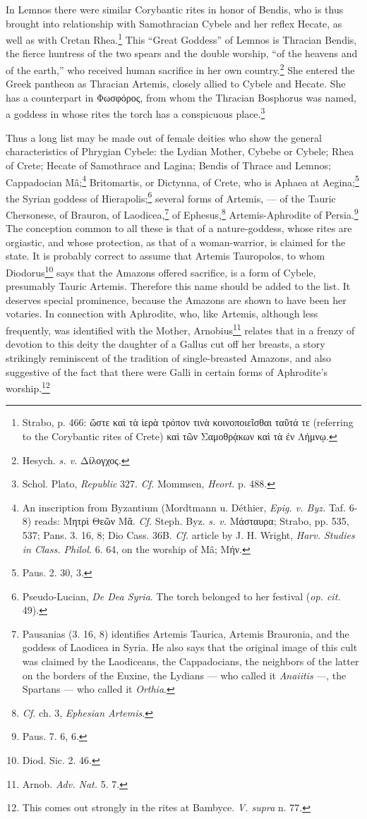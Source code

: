 \documentclass[a4paper, 12pt, oneside]{article}
\begin{document}
In Lemnos there were similar Corybantic rites in honor of Bendis, who is thus brought into relationship with Samothracian Cybele and her reflex Hecate, as well as with Cretan Rhea.\footnote{Strabo, p. 466: ὥστε καὶ τὰ ἱερὰ τρόπον τινὰ κοινοποιεῖσθαι ταῦτά τε (referring to the Corybantic rites of Crete) καὶ τῶν Σαμοθρᾴκων καὶ τὰ ἐν Λήμνῳ.} This ``Great Goddess'' of Lemnos is Thracian Bendis, the fierce huntress of the two spears and the double worship, ``of the heavens and of the earth,'' who received human sacrifice in her own country.\footnote{Hesych. \emph{s. v.} Δίλογχος.} She entered the Greek pantheon as Thracian Artemis, closely allied to Cybele and Hecate. She has a counterpart in Φωσφόρος, from whom the Thracian Bosphorus was named, a goddess in whose rites the torch has a conspicuous place.\footnote{Schol. Plato, \emph{Republic} 327. \emph{Cf.} Mommsen, \emph{Heort.} p. 488.}

Thus a long list may be made out of female deities who show the general characteristics of Phrygian Cybele: the Lydian Mother, Cybebe or Cybele; Rhea of Crete; Hecate of Samothrace and Lagina; Bendis of Thrace and Lemnos; Cappadocian Mâ;\footnote{An inscription from Byzantium (Mordtmann u. Déthier, \emph{Epig. v. Byz.} Taf. 6-8) reads: Μητρὶ Θεῶν Μᾶ. \emph{Cf.} Steph. Byz. \emph{s. v.} Μάσταυρα; Strabo, pp. 535, 537; Pans. 3. 16, 8; Dio Cass. 36B. \emph{Cf.} article by J. H. Wright, \emph{Harv. Studies in Class. Philol.} 6. 64, on the worship of Mâ; Μήν.} Britomartis, or Dictynna, of Crete, who is Aphaea at Aegina;\footnote{Paus. 2. 30, 3.} the Syrian goddess of Hierapolis;\footnote{Pseudo-Lucian, \emph{De Dea Syria}. The torch belonged to her festival (\emph{op. cit.} 49).} several forms of Artemis, --- of the Tauric Chersonese, of Brauron, of Laodicea,\footnote{Pausanias (3. 16, 8) identifies Artemis Taurica, Artemis Brauronia, and the goddess of Laodicea in Syria. He also says that the original image of this cult was claimed by the Laodiceans, the Cappadocians, the neighbors of the latter on the borders of the Euxine, the Lydians --- who called it \emph{Anaiitis} ---, the Spartans --- who called it \emph{Orthia}.} of Ephesus,\footnote{\emph{Cf.} ch. 3, \emph{Ephesian Artemis}.} Artemis-Aphrodite of Persia.\footnote{Paus. 7. 6, 6.} The conception common to all these is that of a nature-goddess, whose rites are orgiastic, and whose protection, as that of a woman-warrior, is claimed for the state. It is probably correct to assume that Artemis Tauropolos, to whom Diodorus\footnote{Diod. Sic. 2. 46.} says that the Amazons offered sacrifice, is a form of Cybele, presumably Tauric Artemis. Therefore this name should be added to the list. It deserves special prominence, because the Amazons are shown to have been her votaries. In connection with Aphrodite, who, like Artemis, although less frequently, was identified with the Mother, Arnobius\footnote{Arnob. \emph{Adv. Nat.} 5. 7.} relates that in a frenzy of devotion to this deity the daughter of a Gallus cut off her breasts, a story strikingly reminiscent of the tradition of single-breasted Amazons, and also suggestive of the fact that there were Galli in certain forms of Aphrodite's worship.\footnote{This comes out strongly in the rites at Bambyce. \emph{V. supra} n. 77.}
\end{document}
